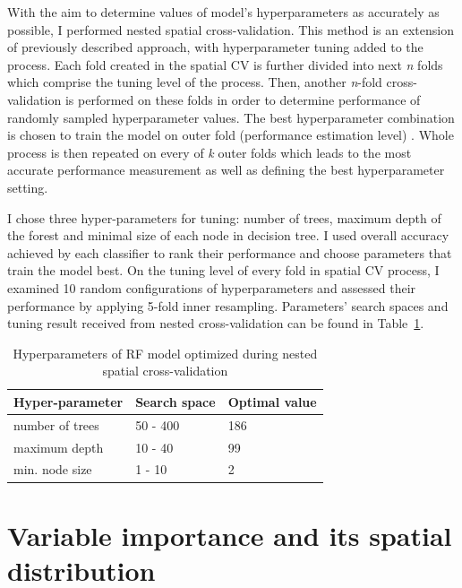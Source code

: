 \documentclass{amuthesis}
\begin{document}
With the aim to determine values of model's hyperparameters as
accurately as possible, I performed nested spatial cross-validation.
This method is an extension of previously described approach, with
hyperparameter tuning added to the process. Each fold created in the
spatial CV is further divided into next \emph{n} folds which comprise
the tuning level of the process. Then, another \emph{n}-fold
cross-validation is performed on these folds in order to determine
performance of randomly sampled hyperparameter values. The best
hyperparameter combination is chosen to train the model on outer fold
(performance estimation level) \autocite{schratz_hyperparameter_2019}.
Whole process is then repeated on every of \emph{k} outer folds which
leads to the most accurate performance measurement as well as defining
the best hyperparameter setting.

I chose three hyper-parameters for tuning: number of trees, maximum
depth of the forest and minimal size of each node in decision tree. I
used overall accuracy achieved by each classifier to rank their
performance and choose parameters that train the model best. On the
tuning level of every fold in spatial CV process, I examined 10 random
configurations of hyperparameters and assessed their performance by
applying 5-fold inner resampling. Parameters' search spaces and tuning
result received from nested cross-validation can be found in
Table~\ref{tbl-tabela3}.

\hypertarget{tbl-tabela3}{}
\begin{table}
\caption{\label{tbl-tabela3}Hyperparameters of RF model optimized during nested spatial
cross-validation }\tabularnewline

\centering
\begin{tabular}{|>{}l|>{}l|>{}l|}
\toprule
\textbf{Hyper-parameter} & \textbf{Search space} & \textbf{Optimal value}\\
\midrule
number of trees & 50 - 400 & 186\\
\hline
maximum depth & 10 - 40 & 99\\
\hline
min. node size & 1 - 10 & 2\\
\bottomrule
\end{tabular}
\end{table}

\hypertarget{sec-importance}{%
\section{Variable importance and its spatial
distribution}\label{sec-importance}}
\end{document}
